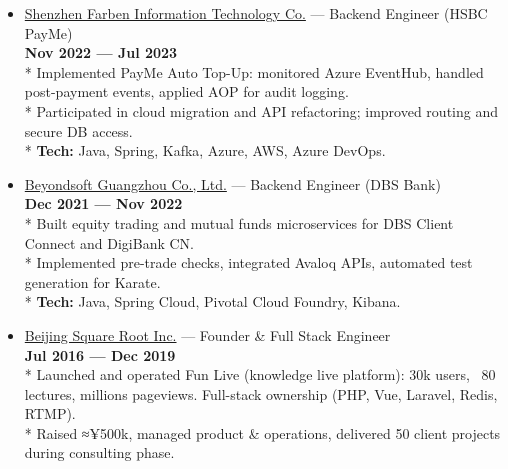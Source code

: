 \documentclass[11pt, a4paper]{latex/awesome-cv}
\begin{document}
\begin{itemize}
\begin{itemize}
            \item \href{https://www.farben.com.cn}{Shenzhen Farben Information Technology Co.} — Backend Engineer (HSBC PayMe) \\
            \textbf{Nov 2022 — Jul 2023} \\
            * Implemented PayMe Auto Top-Up: monitored Azure EventHub, handled post-payment events, applied AOP for audit logging. \\
            * Participated in cloud migration and API refactoring; improved routing and secure DB access. \\
            * \textbf{Tech:} Java, Spring, Kafka, Azure, AWS, Azure DevOps.

            \item \href{https://www.beyondsoft.com}{Beyondsoft Guangzhou Co., Ltd.} — Backend Engineer (DBS Bank) \\
            \textbf{Dec 2021 — Nov 2022} \\
            * Built equity trading and mutual funds microservices for DBS Client Connect and DigiBank CN. \\
            * Implemented pre-trade checks, integrated Avaloq APIs, automated test generation for Karate. \\
            * \textbf{Tech:} Java, Spring Cloud, Pivotal Cloud Foundry, Kibana.

            \item \href{}{Beijing Square Root Inc.} — Founder \& Full Stack Engineer \\
            \textbf{Jul 2016 — Dec 2019} \\
            * Launched and operated Fun Live (knowledge live platform): 30k users, ~80 lectures, millions pageviews. Full-stack ownership (PHP, Vue, Laravel, Redis, RTMP). \\
            * Raised ≈¥500k, managed product \& operations, delivered 50 client projects during consulting phase.


\end{itemize}
\end{itemize}
\end{document}
